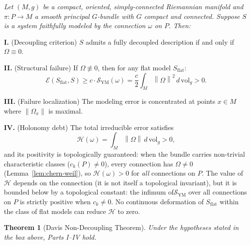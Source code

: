 \documentclass[12pt]{amsart}
\theoremstyle{plain}
\newtheorem{theorem}{Theorem}[section]
\theoremstyle{definition}
\newcommand{\norm}[1]{\left\lVert #1 \right\rVert}
\newcommand{\dVol}{d\,\mathrm{vol}_g}
\begin{document}
\begin{tcolorbox}[colback=goldbg, colframe=goldline, boxrule=1.5pt,
  title={\bfseries Theorem~\ref{thm:main} (Davis Non-Decoupling Theorem)},
  fonttitle=\color{black}]
\itshape Let $(M,g)$ be a compact, oriented, simply-connected Riemannian
manifold and $\pi: P \to M$ a smooth principal $G$-bundle with $G$ compact
and connected. Suppose $S$ is a system faithfully modeled by the connection
$\omega$ on $P$. Then:

\smallskip
\textbf{I.} (Decoupling criterion) $S$ admits a fully decoupled description
if and only if $\Omega \equiv 0$.

\smallskip
\textbf{II.} (Structural failure) If $\Omega \not\equiv 0$, then for any
flat model $S_{\mathrm{flat}}$:
\[
  \mathcal{E}(S_{\mathrm{flat}}, S) \geq c \cdot
  \mathcal{S}_{\mathrm{YM}}(\omega) = \frac{c}{2}\int_M \norm{\Omega}^2\,\dVol > 0.
\]

\textbf{III.} (Failure localization) The modeling error is concentrated at
points $x \in M$ where $\norm{\Omega_x}$ is maximal.

\textbf{IV.} (Holonomy debt) The total irreducible error satisfies
\[
  \mathcal{H}(\omega) = \int_M \norm{\Omega}\,\dVol > 0,
\]
and its positivity is topologically guaranteed: when the bundle carries
non-trivial characteristic classes ($c_k(P) \neq 0$), every connection
has $\Omega \neq 0$ (Lemma~\ref{lem:chern-weil}), so
$\mathcal{H}(\omega) > 0$ for \emph{all} connections on $P$. The value
of $\mathcal{H}$ depends on the connection (it is not itself a
topological invariant), but it is bounded below by a topological
constant: the infimum of$\mathcal{S}_{\mathrm{YM}}$ over all connections
on $P$ is strictly positive when $c_k \neq 0$.
No continuous deformation of $S_{\mathrm{flat}}$ within the class of
flat models can reduce $\mathcal{H}$ to zero.
\end{tcolorbox}

\begin{theorem}[Davis Non-Decoupling Theorem]
\label{thm:main}
Under the hypotheses stated in the box above, Parts I--IV hold.
\end{theorem}
\end{document}
